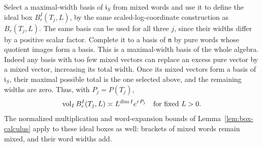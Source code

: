 Select a maximal-width basis of $\mathfrak i_S$ from mixed words and use it
to define the ideal box $B^I_r(T_j,L)$, by the same scaled-log-coordinate
construction as $B_r(T_j,L)$.  The same basis can be used for all three
$j$, since their widths differ by a positive scalar factor.  Complete it
to a basis of $\mathfrak n$ by pure words whose quotient images form a
basis.  This is a maximal-width basis of the whole algebra.  Indeed any
basis with too few mixed vectors can replace an excess pure vector by a
mixed vector, increasing its total width.  Once its mixed vectors form a
basis of $\mathfrak i_S$, their maximal possible total is the one selected
above, and the remaining widths are zero.  Thus, with $P_j=P(T_j)$,
\begin{equation}
 \operatorname{vol}_I B^I_r(T_j,L)\asymp L^{\dim I}e^{rP_j}
 \quad\text{for fixed }L>0.
 \label{eq:ideal-box-volume}
\end{equation}
The normalized multiplication and word-expansion bounds of
Lemma~\ref{lem:box-calculus} apply to these ideal boxes as well: brackets
of mixed words remain mixed, and their word widths add.


